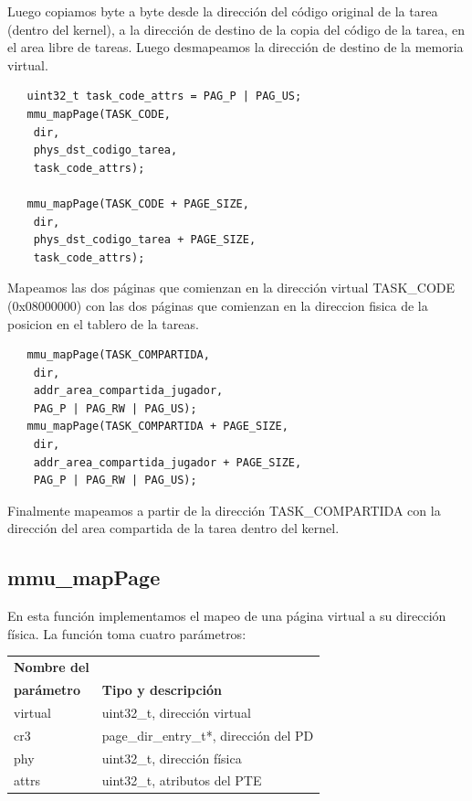 \documentclass[a4paper]{article}
\newenvironment{codesnippet}{%
	\begin{Sbox}\begin{minipage}{\textwidth}\sffamily\small}%
	{\end{minipage}\end{Sbox}%
		\begin{center}%
		\vspace{-0.4cm}\colorbox{litegrey}{\TheSbox}\end{center}\vspace{0.3cm}}
\begin{document}
Luego copiamos byte a byte desde la dirección del código original de la tarea (dentro del kernel), a la dirección de
destino de la copia del código de la tarea, en el area libre de tareas. Luego desmapeamos la dirección de destino de la
memoria virtual.

\begin{codesnippet}
  \begin{verbatim}
   uint32_t task_code_attrs = PAG_P | PAG_US;
   mmu_mapPage(TASK_CODE,
    dir,
    phys_dst_codigo_tarea,
    task_code_attrs);
    
   mmu_mapPage(TASK_CODE + PAGE_SIZE,
    dir,
    phys_dst_codigo_tarea + PAGE_SIZE,
    task_code_attrs);
  \end{verbatim}
\end{codesnippet}

Mapeamos las dos páginas que comienzan en la dirección virtual TASK\_CODE (0x08000000) con las dos páginas que comienzan
en la direccion fisica de la posicion en el tablero de la tareas.

\begin{codesnippet}
  \begin{verbatim}
   mmu_mapPage(TASK_COMPARTIDA,
    dir,
    addr_area_compartida_jugador,
    PAG_P | PAG_RW | PAG_US);
   mmu_mapPage(TASK_COMPARTIDA + PAGE_SIZE,
    dir,
    addr_area_compartida_jugador + PAGE_SIZE,
    PAG_P | PAG_RW | PAG_US);
  \end{verbatim}
\end{codesnippet}

Finalmente mapeamos a partir de la dirección TASK\_COMPARTIDA con la dirección del area compartida de la tarea dentro
del kernel.

\subsection{mmu\_mapPage}
En esta función implementamos el mapeo de una página virtual a su dirección física. La función toma cuatro parámetros:

  \begin{center}
    \label{tab:table2}
    \begin{tabular}{l|l} %
      \textbf{Nombre del} & \\ 
      \textbf{parámetro} &  \textbf{Tipo y descripción}\\
      \hline
      virtual & uint32_t, dirección virtual\\
      cr3 & page_dir_entry_t*, dirección del PD\\
      phy & uint32_t, dirección física\\
      attrs & uint32_t, atributos del PTE\\
    \end{tabular}
  \end{center}
\end{document}
